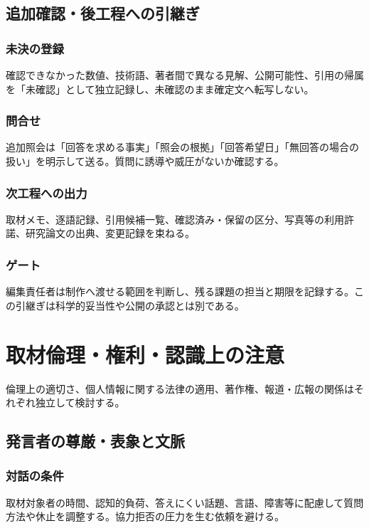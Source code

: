 \documentclass[a4paper,11pt]{article}
\begin{document}
\subsection{追加確認・後工程への引継ぎ}
\subsubsection{未決の登録}
\par 確認できなかった数値、技術語、著者間で異なる見解、公開可能性、引用の帰属を「未確認」として独立記録し、未確認のまま確定文へ転写しない。\par\medskip
\subsubsection{問合せ}
\par 追加照会は「回答を求める事実」「照会の根拠」「回答希望日」「無回答の場合の扱い」を明示して送る。質問に誘導や威圧がないか確認する。\par\medskip
\subsubsection{次工程への出力}
\par 取材メモ、逐語記録、引用候補一覧、確認済み・保留の区分、写真等の利用許諾、研究論文の出典、変更記録を束ねる。\par\medskip
\subsubsection{ゲート}
\par 編集責任者は制作へ渡せる範囲を判断し、残る課題の担当と期限を記録する。この引継ぎは科学的妥当性や公開の承認とは別である。\par\medskip
\section{取材倫理・権利・認識上の注意}
\par 倫理上の適切さ、個人情報に関する法律の適用、著作権、報道・広報の関係はそれぞれ独立して検討する。\par\medskip
\subsection{発言者の尊厳・表象と文脈}
\subsubsection{対話の条件}
\par 取材対象者の時間、認知的負荷、答えにくい話題、言語、障害等に配慮して質問方法や休止を調整する。協力拒否の圧力を生む依頼を避ける。\par\medskip
\end{document}

